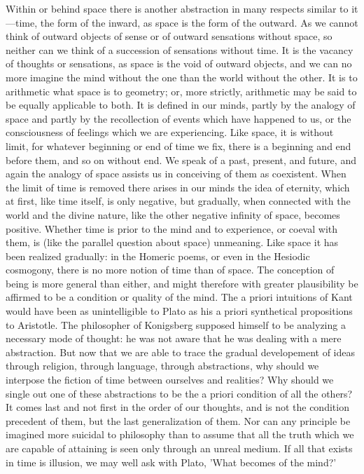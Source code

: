 \documentclass[11pt,letter]{article}
\begin{document}
\par  Within or behind space there is another abstraction in many respects similar to it—time, the form of the inward, as space is the form of the outward. As we cannot think of outward objects of sense or of outward sensations without space, so neither can we think of a succession of sensations without time. It is the vacancy of thoughts or sensations, as space is the void of outward objects, and we can no more imagine the mind without the one than the world without the other. It is to arithmetic what space is to geometry; or, more strictly, arithmetic may be said to be equally applicable to both. It is defined in our minds, partly by the analogy of space and partly by the recollection of events which have happened to us, or the consciousness of feelings which we are experiencing. Like space, it is without limit, for whatever beginning or end of time we fix, there is a beginning and end before them, and so on without end. We speak of a past, present, and future, and again the analogy of space assists us in conceiving of them as coexistent. When the limit of time is removed there arises in our minds the idea of eternity, which at first, like time itself, is only negative, but gradually, when connected with the world and the divine nature, like the other negative infinity of space, becomes positive. Whether time is prior to the mind and to experience, or coeval with them, is (like the parallel question about space) unmeaning. Like space it has been realized gradually: in the Homeric poems, or even in the Hesiodic cosmogony, there is no more notion of time than of space. The conception of being is more general than either, and might therefore with greater plausibility be affirmed to be a condition or quality of the mind. The a priori intuitions of Kant would have been as unintelligible to Plato as his a priori synthetical propositions to Aristotle. The philosopher of Konigsberg supposed himself to be analyzing a necessary mode of thought: he was not aware that he was dealing with a mere abstraction. But now that we are able to trace the gradual developement of ideas through religion, through language, through abstractions, why should we interpose the fiction of time between ourselves and realities? Why should we single out one of these abstractions to be the a priori condition of all the others? It comes last and not first in the order of our thoughts, and is not the condition precedent of them, but the last generalization of them. Nor can any principle be imagined more suicidal to philosophy than to assume that all the truth which we are capable of attaining is seen only through an unreal medium. If all that exists in time is illusion, we may well ask with Plato, 'What becomes of the mind?'
\end{document}
